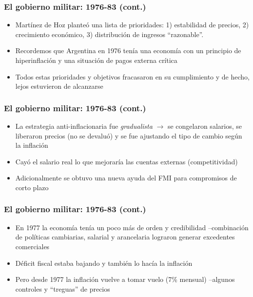 \documentclass[14pt,aspectratio=169]{beamer}
\begin{document}
                \begin{frame}\frametitle{El gobierno militar: 1976-83 (cont.)}
                 \begin{itemize}\itemsep 5pt \medskip
                 \item Martínez de Hoz planteó una lista de
                   prioridades: 1) estabilidad de precios, 2)
                   crecimiento económico, 3) distribución de ingresos
                   ``razonable''.
                   \item Recordemos que Argentina en 1976 tenía una
                     economía con un principio de hiperinflación y una
                     situación de pagos externa crítica
                     \item Todos estas prioridades y objetivos
                       fracasaron en su cumplimiento y de hecho, lejos
                       estuvieron de alcanzarse
                 \end{itemize}
               \end{frame}



 \begin{frame}\frametitle{El gobierno militar: 1976-83 (cont.)}
                 \begin{itemize}\itemsep 5pt \medskip
                 \item La estrategia anti-inflacionaria fue
                   \textit{gradualista} $\longrightarrow$ se
                   congelaron salarios, se liberaron
                   precios (no se devaluó) y se fue ajustando el tipo
                   de cambio según la inflación
                   \item Cayó el salario real lo que mejoraría las
                     cuentas externas (competitividad)
                     \item Adicionalmente se obtuvo una nueva ayuda
                       del FMI para compromisos de corto plazo
                 \end{itemize}
               \end{frame}




               
 \begin{frame}\frametitle{El gobierno militar: 1976-83 (cont.)}
                 \begin{itemize}\itemsep 5pt \medskip
                 \item En 1977 la economía tenía un poco más de orden
                   y credibilidad --combinación de políticas
                   cambiarias, salarial y arancelaria lograron generar
                   excedentes comerciales
                   \item Déficit fiscal estaba bajando y también lo
                     hacía la inflación
                     \item Pero desde 1977 la inflación vuelve a tomar
                       vuelo (7\% mensual) --algunos controles y
                       ``treguas'' de precios
                 \end{itemize}
               \end{frame}
\end{document}
